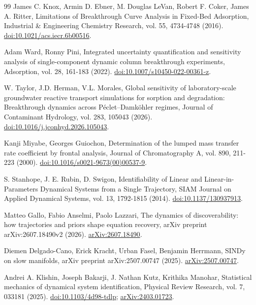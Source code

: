 \documentclass[11pt]{article}
\begin{document}
\begin{thebibliography}{99}
 James C. Knox, Armin D. Ebner, M. Douglas LeVan, Robert F. Coker, James A. Ritter, Limitations of Breakthrough Curve Analysis in Fixed-Bed Adsorption, Industrial \& Engineering Chemistry Research, vol. 55, 4734-4748 (2016). \href{https://doi.org/10.1021/acs.iecr.6b00516}{doi:10.1021/acs.iecr.6b00516}.

 Adam Ward, Ronny Pini, Integrated uncertainty quantification and sensitivity analysis of single-component dynamic column breakthrough experiments, Adsorption, vol. 28, 161-183 (2022). \href{https://doi.org/10.1007/s10450-022-00361-z}{doi:10.1007/s10450-022-00361-z}.

 W. Taylor, J.D. Herman, V.L. Morales, Global sensitivity of laboratory-scale groundwater reactive transport simulations for sorption and degradation: Breakthrough dynamics across Péclet--Damköhler regimes, Journal of Contaminant Hydrology, vol. 283, 105043 (2026). \href{https://doi.org/10.1016/j.jconhyd.2026.105043}{doi:10.1016/j.jconhyd.2026.105043}.

 Kanji Miyabe, Georges Guiochon, Determination of the lumped mass transfer rate coefficient by frontal analysis, Journal of Chromatography A, vol. 890, 211-223 (2000). \href{https://doi.org/10.1016/s0021-9673(00)00537-9}{doi:10.1016/s0021-9673(00)00537-9}.

 S. Stanhope, J. E. Rubin, D. Swigon, Identifiability of Linear and Linear-in-Parameters Dynamical Systems from a Single Trajectory, SIAM Journal on Applied Dynamical Systems, vol. 13, 1792-1815 (2014). \href{https://doi.org/10.1137/130937913}{doi:10.1137/130937913}.

 Matteo Gallo, Fabio Anselmi, Paolo Lazzari, The dynamics of discoverability: how trajectories and priors shape equation recovery, arXiv preprint arXiv:2607.18490v2 (2026). \href{https://arxiv.org/abs/2607.18490}{arXiv:2607.18490}.

 Diemen Delgado-Cano, Erick Kracht, Urban Fasel, Benjamin Herrmann, SINDy on slow manifolds, arXiv preprint arXiv:2507.00747 (2025). \href{https://arxiv.org/abs/2507.00747}{arXiv:2507.00747}.

 Andrei A. Klishin, Joseph Bakarji, J. Nathan Kutz, Krithika Manohar, Statistical mechanics of dynamical system identification, Physical Review Research, vol. 7, 033181 (2025). \href{https://doi.org/10.1103/4d98-tdlp}{doi:10.1103/4d98-tdlp}; \href{https://arxiv.org/abs/2403.01723}{arXiv:2403.01723}.


\end{thebibliography}
\end{document}
